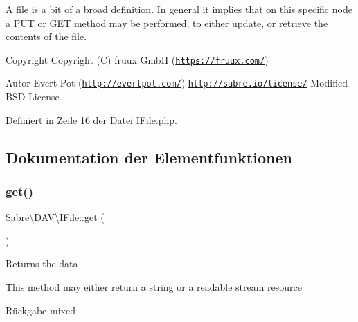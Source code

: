 A file is a bit of a broad definition. In general it implies that on this specific node a P\+UT or G\+ET method may be performed, to either update, or retrieve the contents of the file.

\begin{DoxyCopyright}{Copyright}
Copyright (C) fruux GmbH (\href{https://fruux.com/}{\tt https\+://fruux.\+com/}) 
\end{DoxyCopyright}
\begin{DoxyAuthor}{Autor}
Evert Pot (\href{http://evertpot.com/}{\tt http\+://evertpot.\+com/})  \href{http://sabre.io/license/}{\tt http\+://sabre.\+io/license/} Modified B\+SD License 
\end{DoxyAuthor}


Definiert in Zeile 16 der Datei I\+File.\+php.



\subsection{Dokumentation der Elementfunktionen}
\mbox{\label{interface_sabre_1_1_d_a_v_1_1_i_file_a3102812af0567c3cfd9cd6c20104bd27}} 
\subsubsection{\texorpdfstring{get()}{get()}}
{\footnotesize\ttfamily Sabre\textbackslash{}\+D\+A\+V\textbackslash{}\+I\+File\+::get (\begin{DoxyParamCaption}{ }\end{DoxyParamCaption})}

Returns the data

This method may either return a string or a readable stream resource

\begin{DoxyReturn}{Rückgabe}
mixed 
\end{DoxyReturn}


